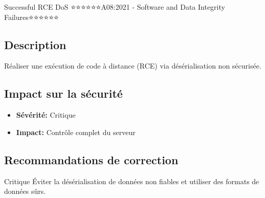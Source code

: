 \begin{vulnerability}{Successful RCE DoS ⭐⭐⭐⭐⭐⭐}{A08:2021 - Software and Data Integrity Failures}{⭐⭐⭐⭐⭐⭐}
    \subsection*{Description}
    Réaliser une exécution de code à distance (RCE) via désérialisation non sécurisée.
    
    \subsection*{Impact sur la sécurité}
    \begin{itemize}
        \item \textbf{Sévérité:} Critique
        \item \textbf{Impact:} Contrôle complet du serveur
    \end{itemize}
    
    \subsection*{Recommandations de correction}
    \begin{recommendation}{Critique}
        Éviter la désérialisation de données non fiables et utiliser des formats de données sûrs.
    \end{recommendation}
\end{vulnerability}
